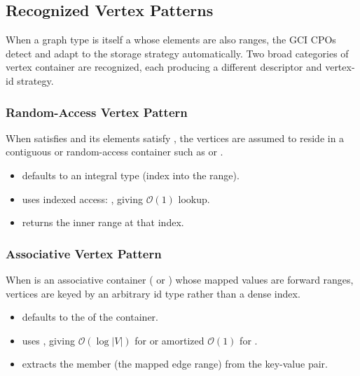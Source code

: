 \subsection{Recognized Vertex Patterns}

When a graph type  is itself a  whose elements are also ranges, the
GCI CPOs detect and adapt to the storage strategy automatically. Two broad categories of vertex
container are recognized, each producing a different descriptor and vertex-id strategy.

\subsubsection{Random-Access Vertex Pattern}
When  satisfies  and its elements satisfy ,
the vertices are assumed to reside in a contiguous or random-access container such as
 or .

\begin{itemize}
    \item {} defaults to an integral type (index into the range).
    \item {} uses indexed access: ,
          giving $\mathcal{O}(1)$ lookup.
    \item {} returns the inner range at that index.
\end{itemize}

\subsubsection{Associative Vertex Pattern}
When  is an associative container ( or )
whose mapped values are forward ranges, vertices are keyed by an arbitrary id type rather than
a dense index.

\begin{itemize}
    \item {} defaults to the  of the container.
    \item {} uses , giving
          $\mathcal{O}(\log |V|)$ for  or amortized $\mathcal{O}(1)$ for
          .
    \item {} extracts the  member (the mapped edge
          range) from the key-value pair.
\end{itemize}

